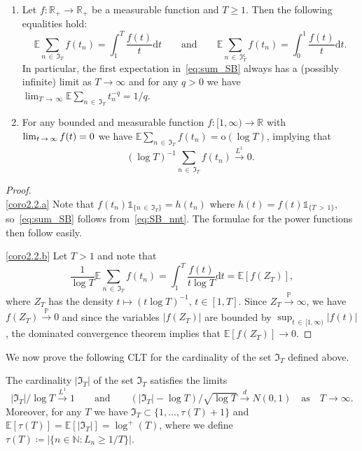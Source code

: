 \documentclass[AHL,Unicode,longabstracts,published]{cedram}
\newcommand\N{\mathbb{N}}
\newcommand\R{\mathbb{R}}
\newcommand\E{\mathds{E}}
\newcommand\p{\mathds{P}}
\newcommand\1{\mathds{1}}
\newcommand\D{\mathrm{d}}
\newcommand\oh{\mathrm{o}}
\newcommand\GI{\mathfrak{I}}
\newcommand\co{\mathsf{c}}
\newcommand\cid{\xrightarrow{d}}
\newcommand\cip{\xrightarrow{\p}}
\newcommand\ciL{\xrightarrow{L^1}}
\newcommand*{\alphenumi}{\renewcommand*{\theenumi}{\alph{enumi}}}
\begin{document}
\begin{coro}\label{cor:int_SB_tauT}
\begin{enumerate}\alphenumi
\item\label{coro2.2.a} Let $f:\R_+\to\R_+$ be a measurable function and $T\geq1$. Then the following equalities hold:
\begin{equation}\label{eq:sum_SB}
\E\sum_{n\,\in\,\GI_T}f(t_n) =\int_1^T \frac{f(t)}{t}\D t
\qquad\text{and}\qquad
\E\sum_{n\,\in\,\GI_T^\co}f(t_n) =\int_0^1 \frac{f(t)}{t}\D t.
\end{equation}
In particular, the first expectation in~\eqref{eq:sum_SB} always has a (possibly infinite) limit as $T\to\infty$ and for any $q>0$ we have $\lim_{T\,\to\,\infty}\E\sum_{n\,\in\,\GI_T}t_n^{-q}=1/q$.

\item\label{coro2.2.b} For any bounded and measurable function $f:[1,\infty)\to\R$ with $\lim_{t\,\to\,\infty}f(t)\linebreak=0$ we have $\E\sum_{n\,\in\,\GI_T}f(t_n)=\oh(\log T)$, implying that 
\[
(\log T)^{-1}\sum_{n\,\in\,\GI_T}f(t_n)\ciL 0.
\]
\end{enumerate}
\end{coro}

\begin{proof}\* \\[0.5em]
\eqref{coro2.2.a} Note that $f(t_n)\1_{\{n\,\in\,\GI_T\}}=h(t_n)$ where $h(t)=f(t)\1_{\{T\,>\,1\}}$, so~\eqref{eq:sum_SB} follows from~\eqref{eq:SB_nnt}. The formulae for the power functions then follow easily.

\noindent\eqref{coro2.2.b} Let $T>1$ and note that
\[
\frac{1}{\log T}\E\sum_{n\,\in\,\GI_T}f(t_n) =\int_1^T \frac{f(t)}{t\log T}\D t =\E\left[f\left(Z_T\right)\right],
\]
where $Z_T$ has the density $t\mapsto (t\log T)^{-1}$, $t\in[1,T]$. Since $Z_T\cip\infty$, we have $f(Z_T)\cip 0$ and since the variables $|f(Z_T)|$ are bounded by $\sup_{t\,\in\,[1,\infty)}|f(t)|$, the dominated convergence theorem implies that $\E[f(Z_T)]\to 0$.
\end{proof}

We now prove the following CLT for the cardinality of the set $\GI_T$ defined above.

\begin{prop}\label{prop:sizeof_n_T}
The cardinality $|\GI_T|$ of the set $\GI_T$ satisfies the limits
\[
|\GI_T|/\log T\ciL 1
\qquad\text{and}\qquad \left(\left|\GI_T\right|-\log T\right)/\sqrt{\log T}\cid N(0,1)
\quad
\text{as}\quad T\to\infty.
\]
Moreover, for any $T$ we have $\GI_T\subset\{1,\ldots,\tau(T)+1\}$ and $\E[\tau(T)]=\E[|\GI_T|]=\log^+(T)$, where we define $\tau(T)\coloneqq|\{n\in\N: L_n\ge1/T\}|$.
\end{prop}
\end{document}
